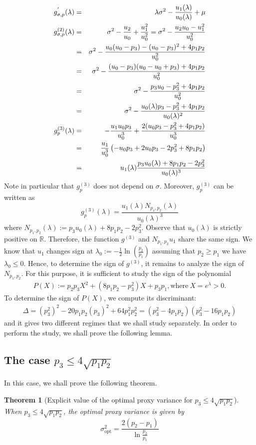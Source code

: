 \documentclass[a4paper, 10pt]{article}
\newcommand{\beq}{\begin{equation}}
\newcommand{\eeq}{\end{equation}}
\newcommand{\bea}{\begin{eqnarray}}
\newcommand{\eea}{\end{eqnarray}}
\newtheorem{theorem}{Theorem}[section]
\theoremstyle{definition}
\begin{document}
\bea g^{'}_{\sigma,p}(\lambda)&=&\lambda \sigma^2 -\frac{u_1(\lambda)}{u_0(\lambda)} + \mu \cr 
g^{(2)}_{\sigma,p}(\lambda)&=&\sigma^2-\frac{u_2}{u_0}+\frac{u_1^2}{u_0^2}= \sigma^2-\frac{u_2u_0-u_1^2}{u_0^2}\cr
&=&\sigma^2-\frac{u_0(u_0-p_3)-(u_0-p_3)^2   +4p_1p_2}{u_0^2}\cr
&=&\sigma^2-\frac{(u_0-p_3)(u_0-u_0+p_3)  +4p_1p_2}{u_0^2}  \cr
&=&\sigma^2-\frac{p_3u_0-p_3^2  +4p_1p_2}{u_0^2}  \cr
&=&\sigma^2-\frac{u_0(\lambda)p_3-p_3^2+4p_1p_2}{u_0(\lambda)^2}\cr
g^{(3)}_{p}(\lambda)&=&-\frac{u_1u_0 p_3}{u_0^3}+\frac{2(u_0p_3-p_3^2+4p_1p_2)}{u_0^3}\cr
&=&\frac{u_1}{u_0^3}\left(-u_0p_3+2u_0p_3-2p_3^2+8p_1p_2\right)\cr
&=&u_1(\lambda)\frac{p_3u_0(\lambda)+8p_1p_2-2p_3^2}{u_0(\lambda)^3}
\eea
Note in particular that $g^{(3)}_{p}$ does not depend on $\sigma$. Moreover, $g^{(3)}_{p}$ can be written as
\beq\label{g3} g^{(3)}_{p}(\lambda) = \frac{u_1(\lambda)N_{p_1,p_2}(\lambda)}{u_0(\lambda)^3} \eeq
where $N_{p_1,p_2}(\lambda) := p_3u_0(\lambda)+8p_1p_2-2p_3^2$. Observe that $u_0(\lambda)$ is strictly positive on $\mathbb{R}$. Therefore, the function $g^{(3)}$ and $N_{p_1, p_2} u_1$ share the same sign. We know that $u_1$ changes sign at $\lambda_0 := -\frac{1}{2}\ln(\frac{p_2}{p_1})$ assuming that $p_2\geq p_1$ we have $\lambda_0 \leq 0$. Hence, to determine the sign of $g^{(3)}$, it remains to analyze the sign of $N_{p_1, p_2}$. For this purpose, it is sufficient to  study the sign of the polynomial
\bea P(X) :=p_2p_3X^2+(8p_1p_2-p_3^2)X+p_3p_1, \text{where}\  X = e^{\lambda} > 0.\eea 
To determine the sign of $P(X)$, we compute its discriminant:
\bea \Delta = (p_3^2)^2 - 20p_1p_2(p_3)^2 + 64p_1^2p_2^2= (p_3^2-4p_1p_2)(p_3^2-16p_1p_2) \eea 
and it gives two different regimes that we shall study separately. In order to perform the study, we shall prove the following lemma.


\subsection{The case $p_3\leq 4\sqrt{p_1p_2}$}
In this case, we shall prove the following theorem.
\begin{theorem}[Explicit value of the optimal proxy variance for $p_3\leq 4\sqrt{p_1p_2}$]\label{TheoRegime1} When $p_3\leq 4\sqrt{p_1p_2}$, the optimal proxy variance is given by
\beq \sigma_{\text{opt}}^2= \frac{2(p_2-p_1)}{\ln \frac{p_2}{p_1}}\eeq
\end{theorem}
\end{document}
